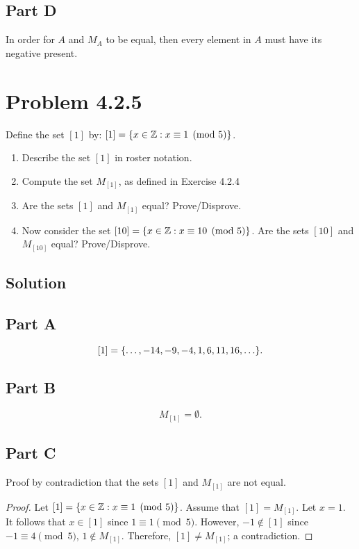 \documentclass[12pt]{extarticle}
\begin{document}
\subsection*{Part D}

In order for $A$ and $M_A$ to be equal, then every element in $A$ must have its negative present.

\section*{Problem 4.2.5}

Define the set $[1]$ by: $[1] = \qty{x \in \mathbb{Z} : x \equiv 1 \pmod{5}}$. 
\begin{enumerate}[label=(\alph*)]
	 \item Describe the set $[1]$ in roster notation. 
	 \item Compute the set $M_{[1]}$, as defined in Exercise 4.2.4 
	 \item Are the sets $[1]$ and $M_{[1]}$ equal? Prove/Disprove. 
	 \item Now consider the set $[10] = \qty{x \in \mathbb{Z} : x \equiv 10 \pmod{5}}$. Are the sets $[10]$ and $M_{[10]}$ equal? Prove/Disprove.
\end{enumerate}

\subsection*{Solution}
\subsection*{Part A}

\[
	[1] = \qty{ \ldots, -14, -9, -4, 1, 6, 11, 16, \ldots }
.\]

\subsection*{Part B}
\[
	M_{[1]} = \emptyset
.\]

\subsection*{Part C}
Proof by contradiction that the sets $[1]$ and $M_{[1]}$ are not equal.
\begin{proof}
	Let $[1] = \qty{x \in \mathbb{Z} : x \equiv 1 \pmod{5}}$. Assume that $[1] = M_{[1]}$. Let $x = 1$. It follows that $x \in [1]$ since $1 \equiv 1 \pmod{5}$. However, $-1 \notin [1]$ since $-1 \equiv 4 \pmod{5}$, $1 \notin M_{[1]}$. Therefore, $[1] \neq M_{[1]}$; a contradiction.
\end{proof}
\end{document}
